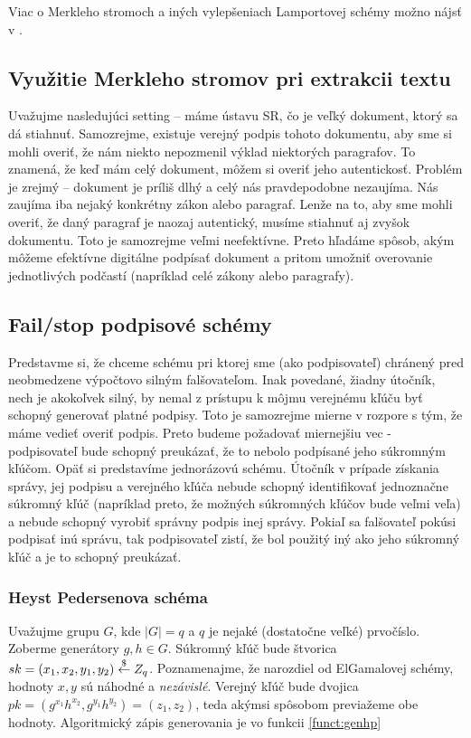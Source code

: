 Viac o Merkleho stromoch a iných vylepšeniach Lamportovej schémy
možno nájsť v \cite{merkle}.

\subsection{Využitie Merkleho stromov pri extrakcii textu}

Uvažujme nasledujúci setting -- máme ústavu SR, čo je veľký dokument, ktorý
sa dá stiahnuť. Samozrejme, existuje verejný podpis tohoto dokumentu, aby
sme si mohli overiť, že nám niekto nepozmenil výklad niektorých paragrafov.
To znamená, že keď mám celý dokument, môžem si overiť jeho autentickosť.
Problém je zrejmý -- dokument je príliš dlhý a celý nás pravdepodobne
nezaujíma. Nás zaujíma iba nejaký konkrétny zákon alebo paragraf. Lenže na
to, aby sme mohli overiť, že daný paragraf je naozaj autentický, musíme
stiahnuť aj zvyšok dokumentu. Toto je samozrejme veľmi neefektívne. Preto
hľadáme spôsob, akým môžeme efektívne digitálne podpísať dokument a pritom
umožniť overovanie jednotlivých podčastí (napríklad celé zákony alebo
paragrafy).
\todo{}

\subsection{Fail/stop podpisové schémy}

Predstavme si, že chceme schému pri ktorej sme (ako podpisovateľ) chránený pred neobmedzene výpočtovo silným
falšovateľom. Inak povedané, žiadny útočník, nech je akokoľvek silný,
by nemal z prístupu k môjmu verejnému kľúču byť schopný generovať
platné podpisy. Toto je samozrejme mierne v rozpore s tým, že máme
vedieť overiť podpis. Preto budeme požadovať miernejšiu vec -
podpisovateľ bude schopný preukázať, že to nebolo podpísané jeho
súkromným kľúčom.
Opäť si predstavíme jednorázovú schému. Útočník v prípade získania
správy, jej podpisu a verejného kľúča nebude schopný identifikovať
jednoznačne súkromný kľúč (napríklad preto, že možných súkromných
kľúčov bude veľmi veľa)
a nebude schopný vyrobiť správny podpis inej správy.
Pokiaľ sa falšovateľ pokúsi podpisať inú správu, tak podpisovateľ zistí, že bol použitý iný
ako jeho súkromný kľúč a je to schopný preukázať.

\subsubsection{Heyst Pedersenova schéma}

Uvažujme grupu $G$, kde $|G| = q$ a $q$ je nejaké (dostatočne veľké) prvočíslo.
Zoberme generátory $g, h \in G$.
Súkromný kľúč bude štvorica  $sk = (x_1, x_2, y_1, y_2) \overset{\$}{\leftarrow} Z_q$.
Poznamenajme, že narozdiel od ElGamalovej schémy, hodnoty $x,y$ sú
náhodné a \emph{nezávislé}.
Verejný kľúč bude dvojica
$pk = (g^{x_1} h^{x_2}, g^{y_1} h^{y_2}) = (z_1, z_2)$, teda akýmsi
spôsobom previažeme obe hodnoty. Algoritmický zápis generovania je vo
funkcii \ref{funct:genhp}

